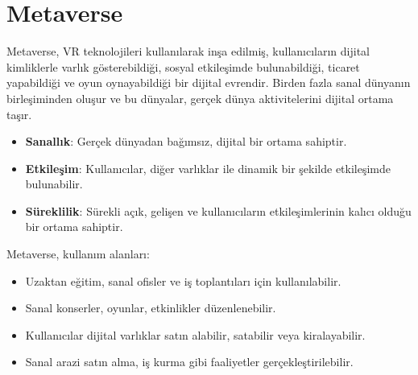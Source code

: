 \section{Metaverse}

Metaverse, VR teknolojileri kullanılarak inşa edilmiş, kullanıcıların dijital kimliklerle varlık gösterebildiği, sosyal etkileşimde bulunabildiği, ticaret yapabildiği ve oyun oynayabildiği bir dijital evrendir. Birden fazla sanal dünyanın birleşiminden oluşur ve bu dünyalar, gerçek dünya aktivitelerini dijital ortama taşır. 

\begin{itemize}
    \item \textbf{Sanallık}: Gerçek dünyadan bağımsız, dijital bir ortama sahiptir.
    \item \textbf{Etkileşim}: Kullanıcılar, diğer varlıklar ile dinamik bir şekilde etkileşimde bulunabilir.
    \item \textbf{Süreklilik}: Sürekli açık, gelişen ve kullanıcıların etkileşimlerinin kalıcı olduğu bir ortama sahiptir.
\end{itemize}

Metaverse, kullanım alanları:

\begin{itemize}
    \item Uzaktan eğitim, sanal ofisler ve iş toplantıları için kullanılabilir.
    \item Sanal konserler, oyunlar, etkinlikler düzenlenebilir.
    \item Kullanıcılar dijital varlıklar satın alabilir, satabilir veya kiralayabilir.
    \item Sanal arazi satın alma, iş kurma gibi faaliyetler gerçekleştirilebilir.
\end{itemize}

\newpage